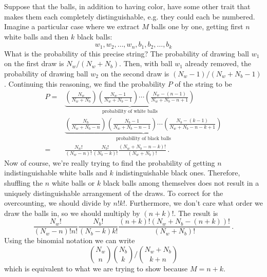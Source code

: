 Suppose that the balls, in addition to having color, have some other trait that makes them each completely distinguishable, e.g. they could each be numbered.
Imagine a particular case where we extract $M$ balls one by one, getting first $n$ white balls and then $k$ black balls:
\begin{equation*}
  w_1, w_2, \ldots , w_n , b_1, b_2, \ldots , b_k
\end{equation*}
What is the probability of this precise string?
The probability of drawing ball $w_1$ on the first draw is $N_w / (N_w + N_b)$.
Then, with ball $w_1$ already removed, the probability of drawing ball $w_2$ on the second draw is $(N_w - 1)/(N_w + N_b - 1)$.
Continuing this reasoning, we find the probability $P$ of the string to be
\begin{align*}
  P =&
  \underbrace{
    \left(
      \frac{N_w}{N_w + N_b}
    \right)
    \left(
      \frac{N_w - 1}{N_w + N_b -1}
    \right)
    \cdots
    \left(
      \frac{N_w - (n - 1)}{N_w + N_b - n + 1}
    \right)
  }_\text{probability of white balls} \\
  & \underbrace{
    \left(
      \frac{N_b}{N_w + N_b - n}
    \right)
    \left(
      \frac{N_b - 1}{N_w + N_b - n - 1}
    \right)
    \cdots
    \left(
      \frac{N_b - (k - 1)}{N_w + N_b - n - k + 1}
    \right)
  }_\text{probability of black balls} \\
  =&
  \frac{N_w!}{(N_w - n)!}
  \frac{N_b!}{(N_b - k)!}
  \frac{(N_w + N_b -n - k)!}{(N_w + N_b)!} \, .
\end{align*}
Now of course, we're really trying to find the probability of getting $n$ indistinguishable white balls and $k$ indistinguishable black ones.
Therefore, shuffling the $n$ white balls or $k$ black balls among themselves does not result in a uniquely distinguishable arrangement of the draws.
To correct for the overcounting, we should divide by $n! k!$.
Furthermore, we don't care what order we draw the balls in, so we should multiply by $(n + k)!$.
The result is
\begin{equation*}
  \frac{N_w!}{(N_w - n)! n!} \frac{N_b!}{(N_b - k)k!} \frac{(n + k)!(N_w + N_b - (n + k))!}{(N_w + N_b)!} \, .
\end{equation*}
Using the binomial notation we can write
\begin{equation*}
  \binom{N_w}{n} \binom{N_b}{k} / \binom{N_w + N_b}{k + n} 
\end{equation*}
which is equivalent to what we are trying to show because $M = n + k$.
